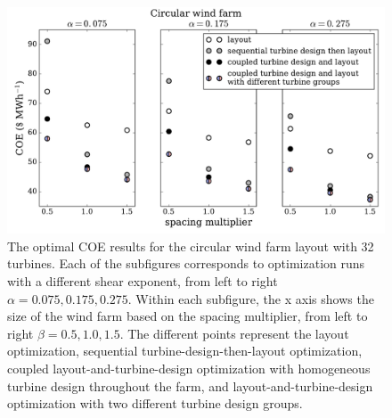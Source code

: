 \begin{figure}[htbp]
  \centering
  \includegraphics[width=\textwidth]{Figures/circular_results1.pdf}
  \caption{\label{circular_results} The optimal COE results for the circular wind farm layout with 32 turbines. Each of the subfigures corresponds to optimization runs with a different shear exponent, from left to right $\alpha=0.075,0.175,0.275$. Within each subfigure, the x axis shows the size of the wind farm based on the spacing multiplier, from left to right $\beta=0.5,1.0,1.5$. The different points represent the layout optimization, sequential turbine-design-then-layout optimization, coupled layout-and-turbine-design optimization with homogeneous turbine design throughout the farm, and layout-and-turbine-design optimization with two different turbine design groups.}
\end{figure}

